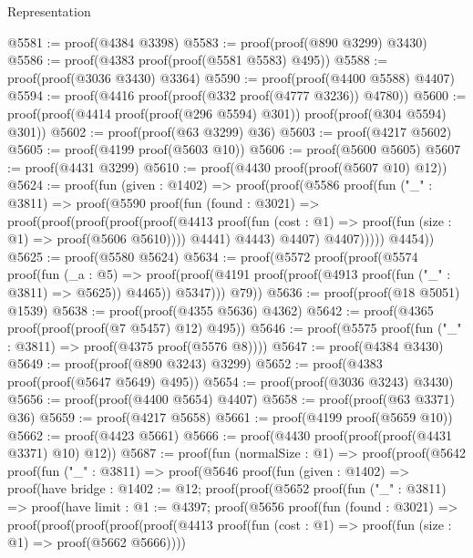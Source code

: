 \begin{lexlean}{Representation}
\begin{coremodule}
@5581 := proof(@4384 @3398)
@5583 := proof(proof(@890 @3299) @3430)
@5586 := proof(@4383 proof(proof(@5581 @5583) @495))
@5588 := proof(proof(@3036 @3430) @3364)
@5590 := proof(proof(@4400 @5588) @4407)
@5594 := proof(@4416 proof(proof(@332 proof(@4777 @3236)) @4780))
@5600 := proof(proof(@4414 proof(proof(@296 @5594) @301)) proof(proof(@304 @5594) @301))
@5602 := proof(proof(@63 @3299) @36)
@5603 := proof(@4217 @5602)
@5605 := proof(@4199 proof(@5603 @10))
@5606 := proof(@5600 @5605)
@5607 := proof(@4431 @3299)
@5610 := proof(@4430 proof(proof(@5607 @10) @12))
@5624 := proof(fun (given : @1402) =>
    proof(proof(@5586
          proof(fun ("_" : @3811) =>
            proof(@5590
                proof(fun (found : @3021) =>
                  proof(proof(proof(proof(proof(@4413
                              proof(fun (cost : @1) =>
                                proof(fun (size : @1) => proof(@5606 @5610))))
                            @4441)
                          @4443)
                        @4407)
                      @4407)))))
        @4454))
@5625 := proof(@5580 @5624)
@5634 := proof(@5572
      proof(proof(@5574
            proof(fun (_a : @5) =>
              proof(proof(@4191 proof(proof(@4913 proof(fun ("_" : @3811) => @5625)) @4465))
                  @5347)))
          @79))
@5636 := proof(proof(@18 @5051) @1539)
@5638 := proof(proof(@4355 @5636) @4362)
@5642 := proof(@4365 proof(proof(proof(@7 @5457) @12) @495))
@5646 := proof(@5575 proof(fun ("_" : @3811) => proof(@4375 proof(@5576 @8))))
@5647 := proof(@4384 @3430)
@5649 := proof(proof(@890 @3243) @3299)
@5652 := proof(@4383 proof(proof(@5647 @5649) @495))
@5654 := proof(proof(@3036 @3243) @3430)
@5656 := proof(proof(@4400 @5654) @4407)
@5658 := proof(proof(@63 @3371) @36)
@5659 := proof(@4217 @5658)
@5661 := proof(@4199 proof(@5659 @10))
@5662 := proof(@4423 @5661)
@5666 := proof(@4430 proof(proof(proof(@4431 @3371) @10) @12))
@5687 := proof(fun (normalSize : @1) =>
    proof(proof(@5642
          proof(fun ("_" : @3811) =>
            proof(@5646
                proof(fun (given : @1402) =>
                  proof(have bridge : @1402 := @12;
                    proof(proof(@5652
                          proof(fun ("_" : @3811) =>
                            proof(have limit : @1 := @4397;
                              proof(@5656
                                  proof(fun (found : @3021) =>
                                    proof(proof(proof(proof(proof(@4413
                                                proof(fun (cost : @1) =>
                                                  proof(fun (size : @1) => proof(@5662 @5666))))

\end{coremodule}
\end{lexlean}

